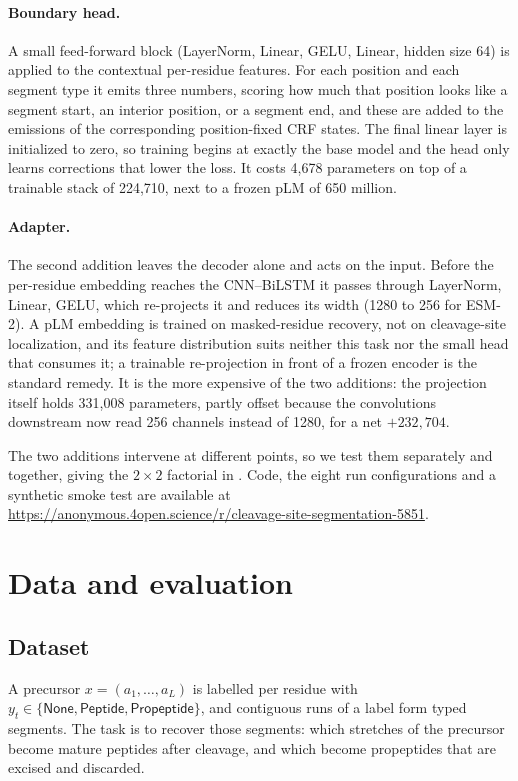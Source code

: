 \documentclass{article}
\begin{document}
\paragraph{Boundary head.} A small feed-forward block (LayerNorm, Linear, GELU, Linear, hidden size 64) is applied to the contextual per-residue features. For each position and each segment type it emits three numbers, scoring how much that position looks like a segment start, an interior position, or a segment end, and these are added to the emissions of the corresponding position-fixed CRF states. The final linear layer is initialized to zero, so training begins at exactly the base model and the head only learns corrections that lower the loss. It costs 4{,}678 parameters on top of a trainable stack of 224{,}710, next to a frozen pLM of 650 million.

\paragraph{Adapter.} The second addition leaves the decoder alone and acts on the input. Before the per-residue embedding reaches the CNN--BiLSTM it passes through LayerNorm, Linear, GELU, which re-projects it and reduces its width (1280 to 256 for ESM-2). A pLM embedding is trained on masked-residue recovery, not on cleavage-site localization, and its feature distribution suits neither this task nor the small head that consumes it; a trainable re-projection in front of a frozen encoder is the standard remedy. It is the more expensive of the two additions: the projection itself holds 331{,}008 parameters, partly offset because the convolutions downstream now read 256 channels instead of 1280, for a net $+232{,}704$.

The two additions intervene at different points, so we test them separately and together, giving the $2\times2$ factorial in . Code, the eight run configurations and a synthetic smoke test are available at \url{https://anonymous.4open.science/r/cleavage-site-segmentation-5851}.

\section{Data and evaluation}
\label{sec:eval}

\subsection{Dataset}
\label{sec:dataset}
A precursor $x=(a_1,\dots,a_L)$ is labelled per residue with $y_t \in \{\textsf{None},\textsf{Peptide},\textsf{Propeptide}\}$, and contiguous runs of a label form typed segments. The task is to recover those segments: which stretches of the precursor become mature peptides after cleavage, and which become propeptides that are excised and discarded.
\end{document}
